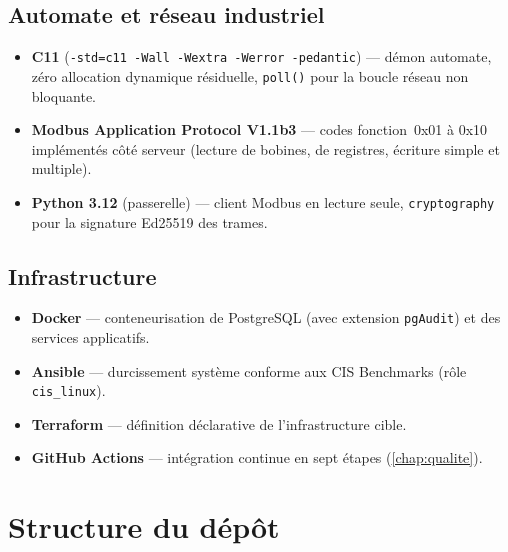 \documentclass[11pt,a4paper]{report}
\begin{document}
\section{Automate et réseau industriel}
\begin{itemize}
  \item \textbf{C11} (\texttt{-std=c11 -Wall -Wextra -Werror -pedantic}) ---
    démon automate, zéro allocation dynamique résiduelle, \texttt{poll()} pour
    la boucle réseau non bloquante.
  \item \textbf{Modbus Application Protocol V1.1b3} --- codes fonction~0x01 à
    0x10 implémentés côté serveur (lecture de bobines, de registres, écriture
    simple et multiple).
  \item \textbf{Python 3.12} (passerelle) --- client Modbus en lecture seule,
    \texttt{cryptography} pour la signature Ed25519 des trames.
\end{itemize}

\section{Infrastructure}
\begin{itemize}
  \item \textbf{Docker} --- conteneurisation de PostgreSQL (avec extension
    \texttt{pgAudit}) et des services applicatifs.
  \item \textbf{Ansible} --- durcissement système conforme aux CIS Benchmarks
    (rôle \texttt{cis\_linux}).
  \item \textbf{Terraform} --- définition déclarative de l'infrastructure
    cible.
  \item \textbf{GitHub Actions} --- intégration continue en sept étapes
    (\cref{chap:qualite}).
\end{itemize}

\chapter{Structure du dépôt}
\end{document}
